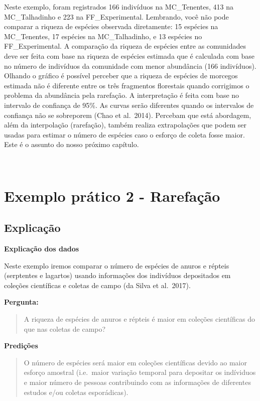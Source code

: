 \documentclass[
]{book}
\begin{document}
Neste exemplo, foram registrados 166 indivíduos na MC\_Tenentes, 413 na MC\_Talhadinho e 223 na FF\_Experimental. Lembrando, você não pode comparar a riqueza de espécies observada diretamente: 15 espécies na MC\_Tenentes, 17 espécies na MC\_Talhadinho, e 13 espécies no FF\_Experimental. A comparação da riqueza de espécies entre as comunidades deve ser feita com base na riqueza de espécies estimada que é calculada com base no número de indivíduos da comunidade com menor abundância (166 indivíduos). Olhando o gráfico é possível perceber que a riqueza de espécies de morcegos estimada não é diferente entre os três fragmentos florestais quando corrigimos o problema da abundância pela rarefação. A interpretação é feita com base no intervalo de confiança de 95\%. As curvas serão diferentes quando os intervalos de confiança não se sobreporem (Chao et al.~2014). Percebam que está abordagem, além da interpolação (rarefação), também realiza extrapolações que podem ser usadas para estimar o número de espécies caso o esforço de coleta fosse maior. Este é o assunto do nosso próximo capítulo.

~

\hypertarget{exemplo-pruxe1tico-2---rarefauxe7uxe3o}{%
\section{Exemplo prático 2 - Rarefação}\label{exemplo-pruxe1tico-2---rarefauxe7uxe3o}}

\hypertarget{explicauxe7uxe3o-1}{%
\subsection{Explicação}\label{explicauxe7uxe3o-1}}

\textbf{Explicação dos dados}

Neste exemplo iremos comparar o número de espécies de anuros e répteis (serptentes e lagartos) usando informações dos indivíduos depositados em coleções científicas e coletas de campo (da Silva et al.~2017).

\textbf{Pergunta:}

\begin{quote}
A riqueza de espécies de anuros e répteis é maior em coleções científicas do que nas coletas de campo?
\end{quote}

\textbf{Predições}

\begin{quote}
O número de espécies será maior em coleções científicas devido ao maior esforço amostral (i.e.~maior variação temporal para depositar os indíviduos e maior número de pessoas contribuindo com as informações de diferentes estudos e/ou coletas esporádicas).
\end{quote}
\end{document}
